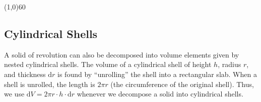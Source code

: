 \documentclass[10.5pt,twoside]{report}
\theoremstyle{definition}
\begin{document}
\line(1,0){60}
\linethickness{0.5mm}
\pagebreak



\subsection{Cylindrical Shells}

A solid of revolution can also be decomposed into volume elements given by nested cylindrical shells.  The volume of a cylindrical shell of height $h$, radius $r$, and thickness $\mathrm{d}r$ is found by ``unrolling'' the shell into a rectangular slab.  When a shell is unrolled, the length is $2\pi r$ (the circumference of the original shell).   Thus, we use $\mathrm{d}V = 2\pi r\cdot h\cdot \mathrm{d}r$ whenever we decompose a solid into cylindrical shells.
\end{document}
